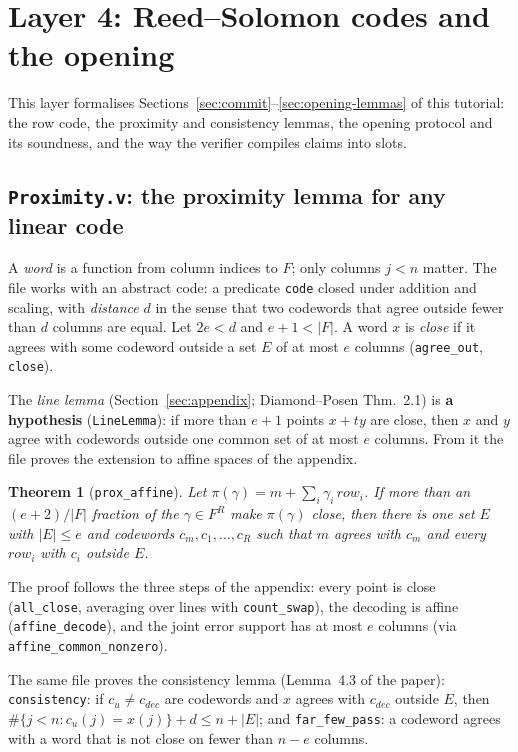 \documentclass[11pt,a4paper]{article}
\theoremstyle{definition}
\theoremstyle{plain}
\newtheorem{theorem}[definition]{Theorem}
\begin{document}
\section{Layer 4: Reed--Solomon codes and the opening}
\label{sec:fm-codes}

This layer formalises Sections~\ref{sec:commit}--\ref{sec:opening-lemmas} of this tutorial: the
row code, the proximity and consistency lemmas, the opening protocol and its soundness, and the
way the verifier compiles claims into slots.

\subsection{\texttt{Proximity.v}: the proximity lemma for any linear code}

A \emph{word} is a function from column indices to $F$; only columns $j<n$ matter. The file works
with an abstract code: a predicate \texttt{code} closed under addition and scaling, with
\emph{distance} $d$ in the sense that two codewords that agree outside fewer than $d$ columns are
equal. Let $2e<d$ and $e+1<|F|$. A word $x$ is \emph{close} if it agrees with some codeword outside
a set $E$ of at most $e$ columns (\texttt{agree\_out}, \texttt{close}).

The \emph{line lemma} (Section~\ref{sec:appendix}; Diamond--Posen Thm.~2.1) is
\textbf{a hypothesis} (\texttt{LineLemma}): if more than $e+1$ points $x+ty$ are close, then $x$ and
$y$ agree with codewords outside one common set of at most $e$ columns. From it the file proves the
extension to affine spaces of the appendix.
\begin{theorem}[\texttt{prox\_affine}]
Let $\pi(\gamma)=m+\sum_i\gamma_i\,\mathit{row}_i$. If more than an $(e+2)/|F|$ fraction of the
$\gamma\in F^R$ make $\pi(\gamma)$ close, then there is one set $E$ with $|E|\le e$ and codewords
$c_m,c_1,\dots,c_R$ such that $m$ agrees with $c_m$ and every $\mathit{row}_i$ with $c_i$ outside
$E$.
\end{theorem}
The proof follows the three steps of the appendix: every point is close (\texttt{all\_close},
averaging over lines with \texttt{count\_swap}), the decoding is affine (\texttt{affine\_decode}),
and the joint error support has at most $e$ columns (via \texttt{affine\_common\_nonzero}).

The same file proves the consistency lemma (Lemma~4.3 of the paper):
\texttt{consistency}: if $c_u\ne c_{dec}$ are codewords and $x$ agrees with $c_{dec}$ outside $E$,
then $\#\{j<n:c_u(j)=x(j)\}+d\le n+|E|$; and \texttt{far\_few\_pass}: a codeword agrees with a word
that is not close on fewer than $n-e$ columns.
\end{document}
